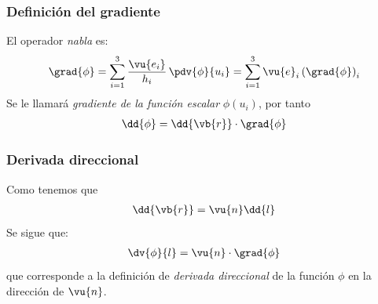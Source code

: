 \begin{frame}
\frametitle{Definición del gradiente}
El operador \emph{nabla} es:
\begin{align}
\grad{\phi} = \sum_{i=1}^{3} \dfrac{\vu{e_{i}}}{h_{i}} \, \pdv{\phi}{u_{i}} = \sum_{i=1}^{3} \vu{e}_{i} \left( \grad{\phi} \right)_{i}
\label{eq:ecuacion_01_28}
\end{align}
\pause
Se le llamará \emph{gradiente de la función escalar} $\phi(u_{i})$, por tanto
\begin{align}
\dd{\phi} = \dd{\vb{r}} \cdot \grad{\phi}
\label{eq:ecuacion_01_29}
\end{align}
\end{frame}
\begin{frame}
\frametitle{Derivada direccional}
Como tenemos que
\begin{align*}
\dd{\vb{r}} = \vu{n} \dd{l}
\end{align*}
\pause
Se sigue que:
\begin{align*}
\dv{\phi}{l} = \vu{n} \cdot \grad{\phi}
\end{align*}
que corresponde a la definición de \emph{derivada direccional} de la función $\phi$ en la dirección de $\vu{n}$.
\end{frame}
